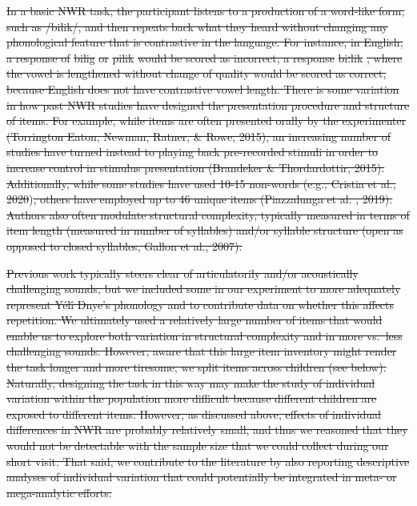 \documentclass[ %
american, %
,man,floatsintext]{apa6} %
\providecommand{\DIFaddtex}[1]{{\protect\color{blue}\uwave{#1}}} %
\providecommand{\DIFdeltex}[1]{{\protect\color{red}\sout{#1}}}                      %
\providecommand{\DIFaddbegin}{} %
\providecommand{\DIFaddend}{} %
\providecommand{\DIFdelbegin}{} %
\providecommand{\DIFdelend}{} %
\providecommand{\DIFadd}[1]{\texorpdfstring{\DIFaddtex{#1}}{#1}} %
\providecommand{\DIFdel}[1]{\texorpdfstring{\DIFdeltex{#1}}{}} %
\newcommand{\DIFscaledelfig}{0.5}
\newlength{\DIFdelgraphicswidth} %
\newlength{\DIFdelgraphicsheight} %
\newcommand{\DIFaddincludegraphics}[2][]{{\color{blue}\fbox{\DIFOincludegraphics[#1]{#2}}}} %
\newcommand{\DIFdelincludegraphics}[2][]{%
	\sbox{\DIFdelgraphicsbox}{\DIFOincludegraphics[#1]{#2}}%
	\settoboxwidth{\DIFdelgraphicswidth}{\DIFdelgraphicsbox} %
	\settoboxtotalheight{\DIFdelgraphicsheight}{\DIFdelgraphicsbox} %
	\scalebox{\DIFscaledelfig}{%
		\parbox[b]{\DIFdelgraphicswidth}{\usebox{\DIFdelgraphicsbox}\\[-\baselineskip] \rule{\DIFdelgraphicswidth}{0em}}\llap{\resizebox{\DIFdelgraphicswidth}{\DIFdelgraphicsheight}{%
				\setlength{\unitlength}{\DIFdelgraphicswidth}%
				\begin{picture}(1,1)%
				\thicklines\linethickness{2pt} %
				{\color[rgb]{1,0,0}\put(0,0){\framebox(1,1){}}}%
				{\color[rgb]{1,0,0}\put(0,0){\line( 1,1){1}}}%
				{\color[rgb]{1,0,0}\put(0,1){\line(1,-1){1}}}%
				\end{picture}%
			}\hspace*{3pt}}} %
} %
\DeclareRobustCommand{\DIFaddbegin}{\DIFOaddbegin \let\includegraphics\DIFaddincludegraphics} %
\DeclareRobustCommand{\DIFaddend}{\DIFOaddend \let\includegraphics\DIFOincludegraphics} %
\DeclareRobustCommand{\DIFdelbegin}{\DIFOdelbegin \let\includegraphics\DIFdelincludegraphics} %
\DeclareRobustCommand{\DIFdelend}{\DIFOaddend \let\includegraphics\DIFOincludegraphics} %
\begin{document}

\DIFdel{In a basic NWR task, the participant listens to a production of a word-like form, such as /bilik/, and then repeats back what they heard without changing any phonological feature that is contrastive in the language. For instance, in English, a response of }%
\DIFdel{bilig}%
\DIFdel{or }%
\DIFdel{pilik}%
\DIFdel{would be scored as incorrect; a response }%
\DIFdel{biːlik}%
\DIFdel{, where the vowel is lengthened without change of quality would be scored as correct, because English does not have contrastive vowel length. There is some variation in how past NWR studies have designed the presentation procedure and structure of items. For example, while items are often presented orally by the experimenter (Torrington Eaton, Newman, Ratner, \& Rowe, 2015), an increasing number of studies have turned instead to playing back pre-recorded stimuli in order to increase control in stimulus presentation (Brandeker \& Thordardottir, 2015). Additionally, while some studies have used 10-15 non-words (e.g., Cristia et al., 2020}\DIFdelend )\DIFdelbegin \DIFdel{, others have employed up to 46 unique items (Piazzalunga et al.
	, 2019). Authors also often modulate structural complexity, typically measured in terms of item length (measured in number of syllables) and/or syllable structure (open as opposed to closed syllables, Gallon et al., 2007).
}\DIFdelend \DIFaddbegin \DIFadd{.
}\DIFaddend 

\DIFdelbegin \DIFdel{Previous work typically steers clear of articulatorily and/or acoustically challenging sounds, but we included some in our experiment to more adequately represent Yélî Dnye's phonology and to contribute data on whether this affects repetition. We ultimately used a relatively large number of items that would enable us to explore both variation in structural complexity and in more vs.~less challenging sounds. However, aware that this large item inventory might render the task longer and more tiresome, we split items across children (see below). Naturally, designing the task in this way may make the study of individual variation within the population more difficult because different children are exposed to different items. However, as discussed above, effects of individual differences in NWR are probably relatively small, and thus we reasoned that they would not be detectable with the sample size that we could collect during our short visit. That said, we contribute to the literature by also reporting descriptive analyses of individual variation that could potentially be integrated in meta- or mega-analytic efforts.
}%
\end{document}
